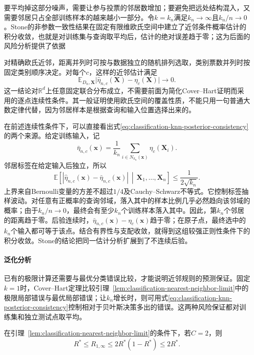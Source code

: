 要平均掉这部分噪声，需要让参与投票的邻居数增加；要避免把远处结构混入，又需要邻居只占全部训练样本的越来越小一部分。令$k=k_n$满足$k_n\to\infty$且$k_n/n\to0$。Stone的非参数一致性结果在固定有限维欧氏空间中建立了近邻条件概率估计的积分收敛，也就是对训练集与查询取平均后，估计的绝对误差趋于零；这为后面的风险分析提供了依据

对精确欧氏近邻，距离并列时可按与数据独立的随机排列选取，类别票数并列时按固定类别顺序决定。对每个$c$，这样的近邻估计满足
\begin{equation}
  \mathbb{E}_{D_n,\bm{X}}
  \bigl|\hat\eta_{n,c}(\bm{X})-\eta_c(\bm{X})\bigr|
  \longrightarrow0.
  \label{eq:classification-knn-posterior-consistency}
\end{equation}
这一结论对$\mathbb{R}^d$上任意固定联合分布成立，不需要前面为简化Cover--Hart证明而采用的逐点连续性条件。其一般证明使用欧氏空间的覆盖性质，不能只用一句普通大数定律代替，因为邻居样本是根据查询和输入位置选择出来的。

在前述连续性条件下，可以直接看出式\eqref{eq:classification-knn-posterior-consistency}的两个来源。给定训练输入，记
\[
  \bar\eta_{n,c}(\bm{x})
  =\frac{1}{k_n}\sum_{i\in N_{k_n}(\bm{x})}\eta_c(\bm{X}_i).
\]
邻居标签在给定输入后独立，所以
\[
  \mathbb{E}\!\left[
    |\hat\eta_{n,c}(\bm{x})-\bar\eta_{n,c}(\bm{x})|
    \,\middle|\,\bm{X}_1,\ldots,\bm{X}_n
  \right]\leq\frac{1}{2\sqrt{k_n}}.
\]
上界来自Bernoulli变量的方差不超过$1/4$及Cauchy--Schwarz不等式。它控制标签抽样波动。对任意有正概率的查询邻域，落入其中的样本比例几乎必然趋向该邻域的概率；由于$k_n/n\to0$，最终会有至少$k_n$个训练样本落入其中。因此，第$k_n$个邻居的距离趋于零。后验连续时，$\bar\eta_{n,c}(\bm{x})-\eta_c(\bm{x})$趋于零；在原子点，最终选中的$k_n$个输入都可等于该点。结合有界性与支配收敛，就得到这组较强正则性条件下的积分收敛。Stone的结论把同一估计分析扩展到了不连续后验。

\paragraph{泛化分析}

已有的极限计算还需要与最优分类错误比较，才能说明近邻规则的预测保证。固定$k=1$时，Cover--Hart定理比较引理~\ref{lem:classification-nearest-neighbor-limit}中的极限局部错误与最优局部错误；让$k_n$增长时，则可用式\eqref{eq:classification-knn-posterior-consistency}控制相对于贝叶斯决策多出的错误。这两种风险保证都对训练集和独立测试点取平均。

\begin{theorem}
  \label{thm:classification-cover-hart-binary}
  在引理~\ref{lem:classification-nearest-neighbor-limit}的条件下，若$C=2$，则
  \begin{equation}
    R^\ast\leq R_{1,\infty}
    \leq2R^\ast(1-R^\ast)\leq2R^\ast.
    \label{eq:classification-cover-hart-binary}
  \end{equation}
\end{theorem}

